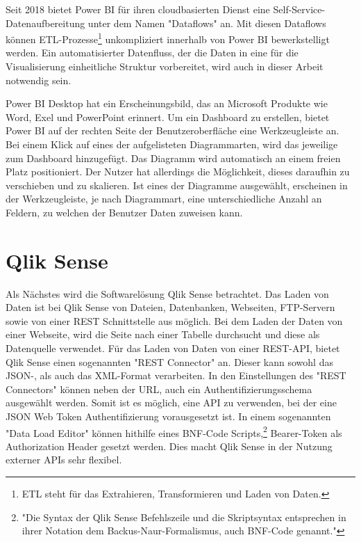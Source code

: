 Seit 2018 bietet Power BI für ihren cloudbasierten Dienst eine Self-Service-Datenaufbereitung unter dem Namen "Dataflows" an.\cite{MicrosoftDataflowsPreview}
Mit diesen Dataflows können ETL-Prozesse\footnote{ETL steht für das Extrahieren, Transformieren und Laden von Daten.}
unkompliziert innerhalb von Power BI bewerkstelligt werden. Ein automatisierter Datenfluss,
der die Daten in eine für die Visualisierung einheitliche Struktur vorbereitet, wird auch in dieser
Arbeit notwendig sein.

Power BI Desktop hat ein Erscheinungsbild, das an Microsoft Produkte wie Word, Exel und
PowerPoint erinnert. Um ein Dashboard zu erstellen, bietet Power BI auf der rechten Seite
der Benutzeroberfläche eine Werkzeugleiste an. Bei einem Klick auf eines der aufgelisteten
Diagrammarten, wird das jeweilige zum Dashboard hinzugefügt. Das Diagramm wird 
automatisch an einem freien Platz positioniert. Der Nutzer hat allerdings die Möglichkeit,
dieses daraufhin zu verschieben und zu skalieren. Ist eines der Diagramme ausgewählt,
erscheinen in der Werkzeugleiste, je nach Diagrammart, eine unterschiedliche Anzahl an Feldern,
zu welchen der Benutzer Daten zuweisen kann.

\section{Qlik Sense}
\label{sec:qliksense}
Als Nächstes wird die Softwarelösung Qlik Sense betrachtet.
Das Laden von Daten ist bei Qlik Sense von Dateien, Datenbanken, Webseiten, FTP-Servern sowie von einer
REST Schnittstelle aus möglich. Bei dem Laden der Daten von einer Webseite, wird die Seite nach einer Tabelle
durchsucht und diese als Datenquelle verwendet.\cite[S. 17]{QlikSenseCookbook} Für das Laden von Daten von
einer REST-API, bietet Qlik Sense einen sogenannten "REST Connector" an. Dieser kann sowohl das \mbox{JSON-,} als auch
das XML-Format verarbeiten. In den Einstellungen des "REST Connectors" können neben der URL, auch ein
Authentifizierungsschema ausgewählt werden.\cite[S. 23]{QlikSenseCookbook} Somit ist es möglich,
eine API zu verwenden, bei der eine JSON Web Token Authentifizierung vorausgesetzt ist. In einem sogenannten
"Data Load Editor" können hithilfe eines BNF-Code Scripts,\footnote{"Die Syntax der Qlik Sense Befehlszeile
und die Skriptsyntax entsprechen in ihrer Notation dem Backus-Naur-Formalismus, auch BNF-Code genannt."\cite{QlikSenseScriptLanguage}}
Bearer-Token als Authorization Header gesetzt werden. Dies macht Qlik Sense in der Nutzung externer
APIs sehr flexibel.

